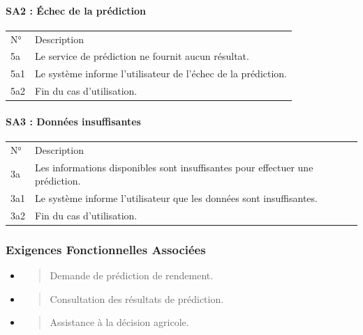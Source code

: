 \documentclass[
]{article}
\begin{document}
\hypertarget{sa2-uxe9chec-de-la-pruxe9diction}{%
\paragraph{SA2 : Échec de la
prédiction}\label{sa2-uxe9chec-de-la-pruxe9diction}}

\begin{longtable}[]{@{}ll@{}}
\toprule
\endhead
N° & Description \\
5a & Le service de prédiction ne fournit aucun résultat. \\
5a1 & Le système informe l'utilisateur de l'échec de la prédiction. \\
5a2 & Fin du cas d'utilisation. \\
\bottomrule
\end{longtable}

\hypertarget{sa3-donnuxe9es-insuffisantes}{%
\paragraph{SA3 : Données
insuffisantes}\label{sa3-donnuxe9es-insuffisantes}}

\begin{longtable}[]{@{}ll@{}}
\toprule
\endhead
N° & Description \\
3a & Les informations disponibles sont insuffisantes pour effectuer une
prédiction. \\
3a1 & Le système informe l'utilisateur que les données sont
insuffisantes. \\
3a2 & Fin du cas d'utilisation. \\
\bottomrule
\end{longtable}

\hypertarget{exigences-fonctionnelles-associuxe9es-3}{%
\subsubsection{Exigences Fonctionnelles
Associées}\label{exigences-fonctionnelles-associuxe9es-3}}

\begin{itemize}
\item
  \begin{quote}
  Demande de prédiction de rendement.
  \end{quote}
\item
  \begin{quote}
  Consultation des résultats de prédiction.
  \end{quote}
\item
  \begin{quote}
  Assistance à la décision agricole.
  \end{quote}
\end{itemize}
\end{document}
